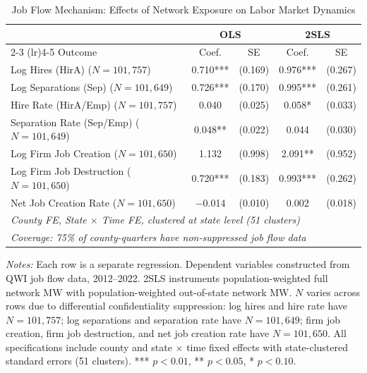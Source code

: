 \documentclass[12pt]{article}
\begin{document}
\begin{table}[t]
\centering
\caption{Job Flow Mechanism: Effects of Network Exposure on Labor Market Dynamics}
\label{tab:jobflows}
\begin{threeparttable}
\begin{tabular}{lcccc}
\toprule
 & \multicolumn{2}{c}{OLS} & \multicolumn{2}{c}{2SLS} \\
\cmidrule(lr){2-3} \cmidrule(lr){4-5}
Outcome & Coef. & SE & Coef. & SE \\
\midrule
Log Hires (HirA) ($N = 101{,}757$) & 0.710*** & (0.169) & 0.976*** & (0.267) \\
Log Separations (Sep) ($N = 101{,}649$) & 0.726*** & (0.170) & 0.995*** & (0.261) \\
Hire Rate (HirA/Emp) ($N = 101{,}757$) & 0.040 & (0.025) & 0.058* & (0.033) \\
Separation Rate (Sep/Emp) ($N = 101{,}649$) & 0.048** & (0.022) & 0.044 & (0.030) \\
Log Firm Job Creation ($N = 101{,}650$) & 1.132 & (0.998) & 2.091** & (0.952) \\
Log Firm Job Destruction ($N = 101{,}650$) & 0.720*** & (0.183) & 0.993*** & (0.262) \\
Net Job Creation Rate ($N = 101{,}650$) & $-$0.014 & (0.010) & 0.002 & (0.018) \\
\midrule
\multicolumn{5}{l}{\textit{County FE, State $\times$ Time FE, clustered at state level (51 clusters)}} \\
\multicolumn{5}{l}{\textit{Coverage: 75\% of county-quarters have non-suppressed job flow data}} \\
\bottomrule
\end{tabular}
\begin{tablenotes}[flushleft]
\small
\item \textit{Notes:} Each row is a separate regression. Dependent variables constructed from QWI job flow data, 2012--2022. 2SLS instruments population-weighted full network MW with population-weighted out-of-state network MW. $N$ varies across rows due to differential confidentiality suppression: log hires and hire rate have $N = 101{,}757$; log separations and separation rate have $N = 101{,}649$; firm job creation, firm job destruction, and net job creation rate have $N = 101{,}650$. All specifications include county and state $\times$ time fixed effects with state-clustered standard errors (51 clusters). *** $p<0.01$, ** $p<0.05$, * $p<0.10$.
\end{tablenotes}
\end{threeparttable}
\end{table}
\end{document}
